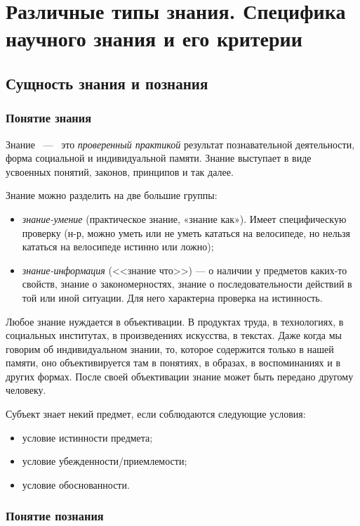 \section{Различные типы знания. Специфика научного знания и его критерии}  

\subsection{Сущность знания и познания}

\subsubsection{Понятие знания}
 
Знание ~---~ это \textit{проверенный практикой} результат познавательной деятельности, 
форма социальной и индивидуальной памяти. Знание выступает в виде усвоенных понятий, законов,
принципов и так далее.  

Знание можно разделить на две большие группы: 
\begin{itemize}
    \item \textit{знание-умение} (практическое знание, «знание как»). Имеет специфическую проверку (н-р, можно уметь или не уметь кататься на велосипеде, но нельзя
кататься на велосипеде истинно или ложно);
    \item \textit{знание-информация} (<<знание что>>) --- о наличии у предметов каких-то свойств, знание о закономерностях, знание о последовательности действий в той или иной ситуации. Для него характерна проверка на истинность.  
\end{itemize}


Любое знание нуждается в
объективации. В продуктах труда, в технологиях, в социальных институтах, в
произведениях искусства, в текстах. Даже когда мы говорим об индивидуальном
знании, то, которое содержится только в нашей памяти, оно объективируется там в
понятиях, в образах, в воспоминаниях и в других формах.  После своей
объективации знание может быть передано другому человеку.  

Субъект знает некий предмет, если соблюдаются следующие условия:
\begin{itemize}
    \item условие истинности предмета;
    \item условие убежденности/приемлемости;
    \item условие обоснованности.
\end{itemize}


\subsubsection{Понятие познания}

